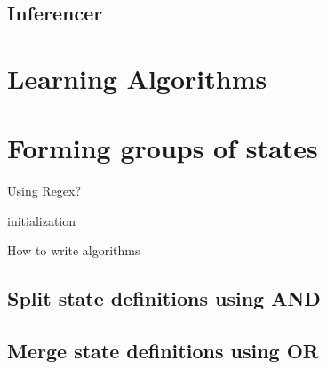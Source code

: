 \subsection{Inferencer}

\section{Learning Algorithms} 

\section{Forming groups of states}
Using Regex?

\begin{algorithm}[H]
\SetAlgoLined
{}
 initialization\;
 \caption{How to write algorithms}
\end{algorithm}

\subsection{Split state definitions using AND}


\subsection{Merge state definitions using OR}
